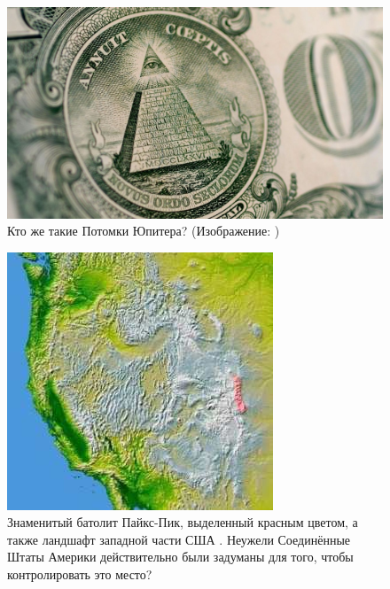 \documentclass[10pt,twocolumn,letterpaper]{article}
\begin{document}
\begin{figure}[t]
\begin{center}

\includegraphics[width=1\linewidth]{illuminati.jpg}
\end{center}
   \caption{Кто же такие Потомки Юпитера? (Изображение: \cite{35})}
\label{fig:10}
\label{fig:onecol}
\end{figure}

\begin{figure}[t]
\begin{center}
   \includegraphics[width=1\linewidth]{pike.jpg}
\end{center}
   \caption{Знаменитый батолит Пайкс-Пик, выделенный красным цветом, а также ландшафт западной части США \cite{36}. Неужели Соединённые Штаты Америки действительно были задуманы для того, чтобы контролировать это место?}
\label{fig:11}
\label{fig:onecol}
\end{figure}
\end{document}
